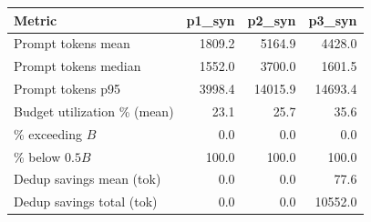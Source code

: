 \begin{tabular}{lrrr}
\toprule
Metric & p1\_syn & p2\_syn & p3\_syn \\
\midrule
Prompt tokens mean & 1809.2 & 5164.9 & 4428.0 \\
Prompt tokens median & 1552.0 & 3700.0 & 1601.5 \\
Prompt tokens p95 & 3998.4 & 14015.9 & 14693.4 \\
Budget utilization \% (mean) & 23.1 & 25.7 & 35.6 \\
\% exceeding $B$ & 0.0 & 0.0 & 0.0 \\
\% below $0.5B$ & 100.0 & 100.0 & 100.0 \\
Dedup savings mean (tok) & 0.0 & 0.0 & 77.6 \\
Dedup savings total (tok) & 0.0 & 0.0 & 10552.0 \\
\bottomrule
\end{tabular}
